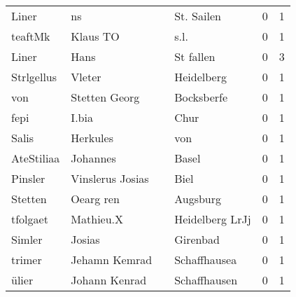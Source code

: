 \begin{center}
\begin{tiny}
\begin{longtabu}{llllrr}
                    Liner &                                 ns &             &                                  St. Sailen &          0 &         1 \\
                  teaftMk &                           Klaus TO &             &                                        s.l. &          0 &         1 \\
                    Liner &                               Hans &             &                                   St fallen &          0 &         3 \\
               Strlgellus &                             Vleter &             &                                  Heidelberg &          0 &         1 \\
                      von &                      Stetten Georg &             &                                  Bocksberfe &          0 &         1 \\
                     fepi &                              I.bia &             &                                        Chur &          0 &         1 \\
                    Salis &                           Herkules &             &                                         von &          0 &         1 \\
               AteStiliaa &                           Johannes &             &                                       Basel &          0 &         1 \\
                  Pinsler &                   Vinslerus Josias &             &                                        Biel &          0 &         1 \\
                  Stetten &                          Oearg ren &             &                                    Augsburg &          0 &         1 \\
                 tfolgaet &                          Mathieu.X &             &                             Heidelberg LrJj &          0 &         1 \\
                   Simler &                             Josias &             &                                    Girenbad &          0 &         1 \\
                   trimer &                      Jehamn Kemrad &             &                                Schaffhausea &          0 &         1 \\
                    ülier &                      Johann Kenrad &             &                                Schaffhausen &          0 &         1 \\

\end{longtabu}
\end{tiny}
\end{center}
